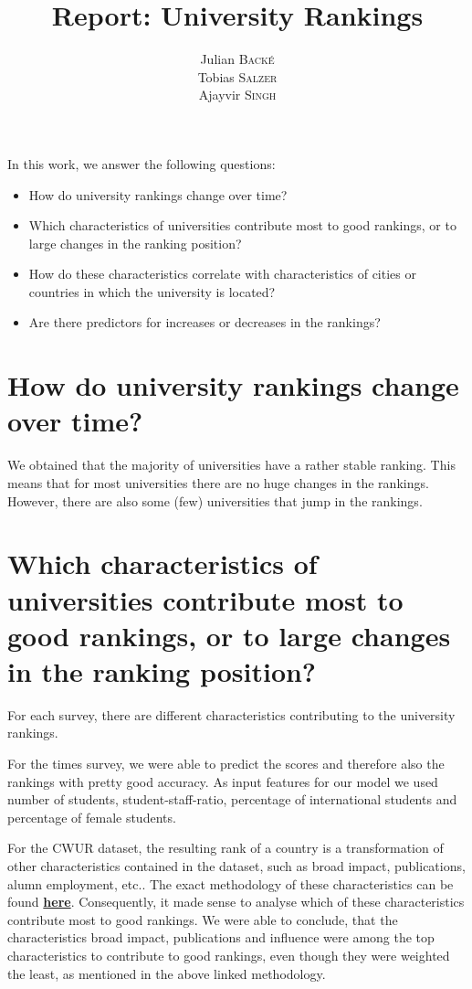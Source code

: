 \documentclass{article}
\title{Report: \textbf{University Rankings}} %
\author{Julian \textsc{Backé} \\ Tobias \textsc{Salzer} \\ Ajayvir \textsc{Singh}} %
\begin{document}
\maketitle %

In this work, we answer the following questions:

\begin{itemize}
	\item How do university rankings change over time? 
	
	\item Which characteristics of universities contribute most to good rankings, or to large changes in the ranking position? 
	
	\item How do these characteristics correlate with characteristics of cities or countries in which the university is located? 
	
	\item Are there predictors for increases or decreases in the rankings?
\end{itemize}

\section*{\large{How do university rankings change over time?}}
We obtained that the majority of universities have a rather stable ranking. This means that for most universities there are no huge changes in the rankings. However, there are also some (few) universities that jump in the rankings.

\section*{\large{Which characteristics of universities contribute most to good rankings, or to large changes in the ranking position?}}

For each survey, there are different characteristics contributing to the university rankings.

For the times survey, we were able to predict the scores and therefore also the rankings with pretty good accuracy. As input features for our model we used number of students, student-staff-ratio, percentage of international students and percentage of female students.

For the CWUR dataset, the resulting rank of a country is a transformation of other characteristics contained in the dataset, such as broad impact, publications, alumn employment, etc..
The exact methodology of these characteristics can be found \href{https://cwur.org/methodology/world-university-rankings.php}{ \textbf{here}}.
Consequently, it made sense to analyse which of these characteristics contribute most to good rankings. 
We were able to conclude, that the characteristics broad impact, publications and influence were among the top characteristics to contribute to good rankings, even though they were weighted the least, as mentioned in the above linked methodology.
\end{document}
